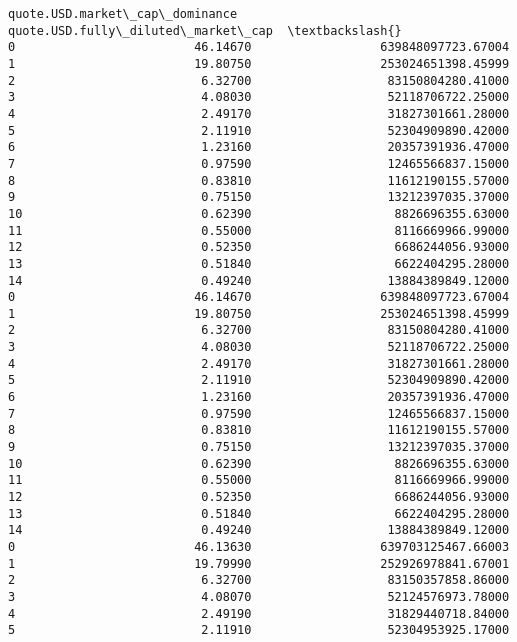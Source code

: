 \documentclass[11pt]{article}
\begin{document}
\begin{tcolorbox}[breakable, size=fbox, boxrule=.5pt, pad at break*=1mm, opacityfill=0]
\begin{Verbatim}[commandchars=\\\{\}]
    quote.USD.market\_cap\_dominance  quote.USD.fully\_diluted\_market\_cap  \textbackslash{}
0                         46.14670                  639848097723.67004
1                         19.80750                  253024651398.45999
2                          6.32700                   83150804280.41000
3                          4.08030                   52118706722.25000
4                          2.49170                   31827301661.28000
5                          2.11910                   52304909890.42000
6                          1.23160                   20357391936.47000
7                          0.97590                   12465566837.15000
8                          0.83810                   11612190155.57000
9                          0.75150                   13212397035.37000
10                         0.62390                    8826696355.63000
11                         0.55000                    8116669966.99000
12                         0.52350                    6686244056.93000
13                         0.51840                    6622404295.28000
14                         0.49240                   13884389849.12000
0                         46.14670                  639848097723.67004
1                         19.80750                  253024651398.45999
2                          6.32700                   83150804280.41000
3                          4.08030                   52118706722.25000
4                          2.49170                   31827301661.28000
5                          2.11910                   52304909890.42000
6                          1.23160                   20357391936.47000
7                          0.97590                   12465566837.15000
8                          0.83810                   11612190155.57000
9                          0.75150                   13212397035.37000
10                         0.62390                    8826696355.63000
11                         0.55000                    8116669966.99000
12                         0.52350                    6686244056.93000
13                         0.51840                    6622404295.28000
14                         0.49240                   13884389849.12000
0                         46.13630                  639703125467.66003
1                         19.79990                  252926978841.67001
2                          6.32700                   83150357858.86000
3                          4.08070                   52124576973.78000
4                          2.49190                   31829440718.84000
5                          2.11910                   52304953925.17000

\end{Verbatim}
\end{tcolorbox}
\end{document}
